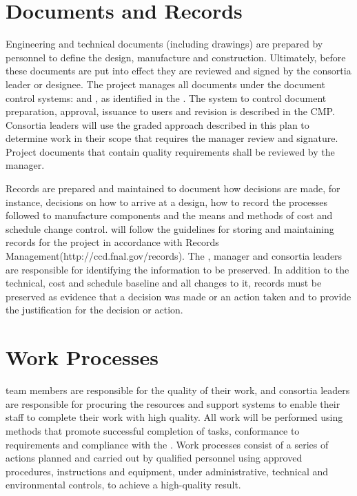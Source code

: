 \section{Documents and Records}

Engineering and technical documents (including drawings) are prepared
by  personnel to define the design, manufacture and
construction. Ultimately, before these documents are put into effect
they are reviewed and signed by the  consortia leader or
designee. The
 project manages all documents under the document control
systems:  and \docdb, as identified in the 
.  The system to control document preparation, approval,
issuance to users and revision is described in the CMP. Consortia
leaders will use the graded approach described in this plan to
determine work in their scope that requires the 
 manager review and signature. Project documents that
contain quality requirements shall be reviewed by the
  manager.

Records are prepared and maintained to document how decisions are
made, for instance, decisions on how to arrive at a design, how to
record the processes followed to manufacture components and the means
and methods of cost and schedule change
control.  will follow the guidelines for
storing and maintaining records for the project in accordance with
\fnal Records Management(http://ccd.fnal.gov/records). The
 ,  
manager and consortia leaders are responsible for identifying the
information to be preserved. In addition to the technical, cost and
schedule baseline and all changes to it, records must be preserved as
evidence that a decision was made or an action taken and to provide
the justification for the decision or action.

\section{Work Processes}

 team members are responsible for the quality of their
work, and consortia leaders are responsible for procuring the
resources and support systems to enable their staff to complete their
work with high quality. All  work will be performed using
methods that promote successful completion of tasks, conformance to
 requirements and compliance with the
 . Work processes consist of a
series of actions planned and carried out by qualified personnel using
approved procedures, instructions and equipment, under administrative,
technical and environmental controls, to achieve a high-quality
result.

